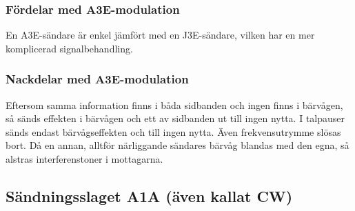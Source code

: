 \subsubsection{Fördelar med A3E-modulation}

En A3E-sändare är enkel jämfört med en J3E-sändare, vilken har en mer
komplicerad signalbehandling.

\subsubsection{Nackdelar med A3E-modulation}

Eftersom samma information finns i båda sidbanden och ingen finns i bärvågen,
så sänds effekten i bärvågen och ett av sidbanden ut till ingen nytta.
I talpauser sänds endast bärvågseffekten och till ingen nytta.
Även frekvensutrymme slösas bort.
Då en annan, alltför närliggande sändares bärvåg blandas med den egna, så
alstras interferenstoner i mottagarna.

\subsection{Sändningsslaget A1A (även kallat CW)}

